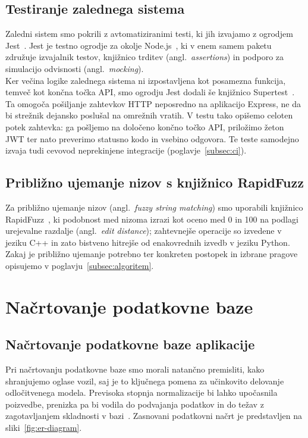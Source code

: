 \documentclass[a4paper,12pt,openright]{book}
\begin{document}
\subsection{Testiranje zalednega sistema}
\label{sec:testiranje-be}
Zaledni sistem smo pokrili z avtomatiziranimi testi, ki jih izvajamo z ogrodjem
Jest~\cite{jest-docs}. Jest je testno ogrodje za okolje Node.js~\cite{nodejs}, ki v enem samem paketu združuje
izvajalnik testov, knjižnico trditev (angl.\ \textit{assertions}) in podporo za simulacijo
odvisnosti (angl.\ \textit{mocking}).\\
Ker večina logike zalednega sistema ni izpostavljena kot posamezna funkcija, temveč kot končna točka API,
smo ogrodju Jest dodali še knjižnico Supertest~\cite{supertest-docs}. Ta omogoča
pošiljanje zahtevkov HTTP neposredno na aplikacijo Express, ne da bi strežnik dejansko poslušal
na omrežnih vratih. V testu tako opišemo celoten potek zahtevka: ga pošljemo na določeno
končno točko API, priložimo žeton JWT ter nato preverimo statusno kodo in vsebino odgovora.
Te teste samodejno izvaja tudi cevovod neprekinjene integracije (poglavje~\ref{subsec:ci}).

\subsection{Približno ujemanje nizov s knjižnico RapidFuzz}
\label{subsec:rapidfuzz}
Za približno ujemanje nizov (angl.\ \textit{fuzzy string matching}) smo uporabili
knjižnico RapidFuzz~\cite{rapidfuzz-docs}, ki podobnost med nizoma izrazi kot oceno
med 0 in 100 na podlagi urejevalne razdalje (angl.\ \textit{edit distance}); zahtevnejše
operacije so izvedene v jeziku C++ in zato bistveno hitrejše od
enakovrednih izvedb v jeziku Python. Zakaj je približno ujemanje potrebno ter konkreten
postopek in izbrane pragove opisujemo v poglavju~\ref{subsec:algoritem}.

\section{Načrtovanje podatkovne baze}

\subsection{Načrtovanje podatkovne baze aplikacije}
Pri načrtovanju podatkovne baze smo morali natančno premisliti, kako shranjujemo
oglase vozil, saj je to ključnega pomena za učinkovito delovanje odločitvenega
modela. Previsoka stopnja normalizacije bi lahko upočasnila poizvedbe, prenizka pa bi
vodila do podvajanja podatkov in do težav z zagotavljanjem skladnosti v bazi~\cite{elmasri2015fundamentals}. Zasnovani
podatkovni načrt je predstavljen na sliki~\ref{fig:er-diagram}.\\
\end{document}
